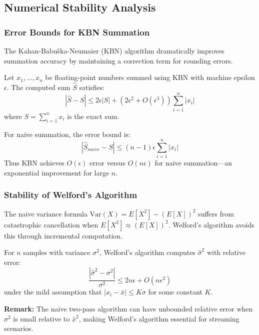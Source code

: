 \documentclass[sigconf]{acmart}
\begin{document}
\subsection{Numerical Stability Analysis}

\subsubsection{Error Bounds for KBN Summation}

The Kahan-Babuška-Neumaier (KBN) algorithm dramatically improves summation accuracy by maintaining a correction term for rounding errors.

\begin{theorem}
Let $x_1, \ldots, x_n$ be floating-point numbers summed using KBN with machine epsilon $\epsilon$. The computed sum $\hat{S}$ satisfies:
$$|\hat{S} - S| \leq 2\epsilon |S| + (2\epsilon^2 + O(\epsilon^3)) \sum_{i=1}^{n} |x_i|$$
where $S = \sum_{i=1}^{n} x_i$ is the exact sum.
\end{theorem}

\begin{corollary}
For naive summation, the error bound is:
$$|\hat{S}_{naive} - S| \leq (n-1)\epsilon \sum_{i=1}^{n} |x_i|$$
Thus KBN achieves $O(\epsilon)$ error versus $O(n\epsilon)$ for naive summation---an exponential improvement for large $n$.
\end{corollary}

\subsubsection{Stability of Welford's Algorithm}

The naive variance formula $\text{Var}(X) = E[X^2] - (E[X])^2$ suffers from catastrophic cancellation when $E[X^2] \approx (E[X])^2$. Welford's algorithm avoids this through incremental computation.

\begin{theorem}
For $n$ samples with variance $\sigma^2$, Welford's algorithm computes $\hat{\sigma}^2$ with relative error:
$$\frac{|\hat{\sigma}^2 - \sigma^2|}{\sigma^2} \leq 2n\epsilon + O(n\epsilon^2)$$
under the mild assumption that $|x_i - \bar{x}| \leq K\sigma$ for some constant $K$.
\end{theorem}

\textbf{Remark:} The naive two-pass algorithm can have unbounded relative error when $\sigma^2$ is small relative to $\bar{x}^2$, making Welford's algorithm essential for streaming scenarios.
\end{document}
